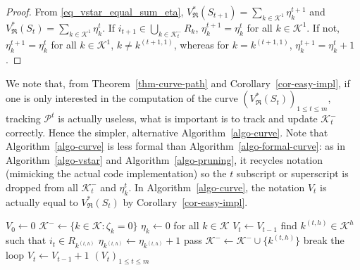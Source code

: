 \documentclass[
  11pt,
  a4paper,
]{article}
\theoremstyle{plain}
\theoremstyle{plain}
\theoremstyle{definition}
\theoremstyle{plain}
\theoremstyle{definition}
\theoremstyle{remark}
\begin{document}
\begin{proof}
From \eqref{eq_vstar_equal_sum_eta},
\(V^*_{\mathfrak{R}}(S_{t+1})=\sum_{k\in\mathcal{K}^1} \eta_k^{t+1}\)
and \(V^*_{\mathfrak{R}}(S_{t})=\sum_{k\in\mathcal{K}^1} \eta_k^{t}\).
If \(i_{t+1}\in \bigcup_{k\in\mathcal{K}^-_t}R_k\),
\(\eta_k^{t+1}=\eta_k^{t}\) for all \(k\in\mathcal{K}^1\). If not,
\(\eta_k^{t+1}=\eta_k^{t}\) for all \(k\in\mathcal{K}^1\),
\(k\neq k^{(t+1,1)}\), whereas for \(k= k^{(t+1,1)}\),
\(\eta_k^{t+1}=\eta_k^{t}+1\).
\end{proof}

We note that, from Theorem~\ref{thm-curve-path} and
Corollary~\ref{cor-easy-impl}, if one is only interested in the
computation of the curve
\(\left(V^*_{\mathfrak{R}}(S_{t})\right)_{1\leq t\leq m}\), tracking
\(\mathcal{P}^t\) is actually useless, what is important is to track and
update \(\mathcal{K}^-_t\) correctly. Hence the simpler, alternative
Algorithm~\ref{algo-curve}. Note that Algorithm~\ref{algo-curve} is less
formal than Algorithm~\ref{algo-formal-curve}: as in
Algorithm~\ref{algo-vstar} and Algorithm~\ref{algo-pruning}, it recycles
notation (mimicking the actual code implementation) so the \(t\)
subscript or superscript is dropped from all \(\mathcal{K}^-_t\) and
\(\eta_k^t\). In Algorithm~\ref{algo-curve}, the notation \(V_t\) is
actually equal to \(V^*_{\mathfrak{R}}(S_{t})\) by
Corollary~\ref{cor-easy-impl}.

\begin{algorithm}[htb!]
\caption{\label{algo-curve}Practical computation of $(V^*_{\mathfrak{R}}(S_t))_{0\leq t\leq m}$}
\begin{algorithmic}[1]
  \State $V_0\gets 0$
  \State $\mathcal{K}^-\gets\{k\in\mathcal{K} : \zeta_k=0  \}$
  \State $\eta_k\gets 0$ for all $k\in\mathcal{K}$
      \State $V_{t}\gets V_{t-1}$
    \Else
        \State find $k^{(t,h)}\in\mathcal{K}^{h}$ such that $i_t\in R_{k^{(t,h)}}$
        \State $\eta_{k^{(t,h)}}\gets\eta_{k^{(t,h)}} + 1$
          \State pass
        \Else
          \State $\mathcal{K}^- \gets \mathcal{K}^-\cup \{ k^{(t,h)} \}$
          \State break the loop
        \EndIf
      \EndFor
     \State $V_{t}\gets V_{t-1} + 1$
    \EndIf
  \EndFor
  \State\Return $(V_t)_{1\leq t \leq m}$
\EndProcedure
\end{algorithmic}
\end{algorithm}
\end{document}
